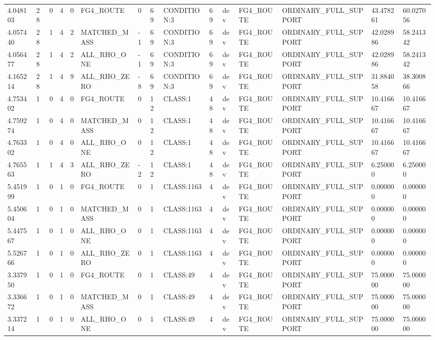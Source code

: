 \begin{tabular}{lllllllllllllll}
4.048103 & 28 & 0 & 4 & 0 & FG4\_ROUTE & 0 & 69 & CONDITION:3 & 69 & dev & FG4\_ROUTE & ORDINARY\_FULL\_SUPPORT & 43.478261 & 60.027056 \\
4.057440 & 28 & 1 & 4 & 2 & MATCHED\_MASS & -1 & 69 & CONDITION:3 & 69 & dev & FG4\_ROUTE & ORDINARY\_FULL\_SUPPORT & 42.028986 & 58.241342 \\
4.056477 & 28 & 1 & 4 & 2 & ALL\_RHO\_ONE & -1 & 69 & CONDITION:3 & 69 & dev & FG4\_ROUTE & ORDINARY\_FULL\_SUPPORT & 42.028986 & 58.241342 \\
4.165214 & 28 & 1 & 4 & 9 & ALL\_RHO\_ZERO & -8 & 69 & CONDITION:3 & 69 & dev & FG4\_ROUTE & ORDINARY\_FULL\_SUPPORT & 31.884058 & 38.300866 \\
4.753402 & 1 & 0 & 4 & 0 & FG4\_ROUTE & 0 & 12 & CLASS:1 & 48 & dev & FG4\_ROUTE & ORDINARY\_FULL\_SUPPORT & 10.416667 & 10.416667 \\
4.759274 & 1 & 0 & 4 & 0 & MATCHED\_MASS & 0 & 12 & CLASS:1 & 48 & dev & FG4\_ROUTE & ORDINARY\_FULL\_SUPPORT & 10.416667 & 10.416667 \\
4.763302 & 1 & 0 & 4 & 0 & ALL\_RHO\_ONE & 0 & 12 & CLASS:1 & 48 & dev & FG4\_ROUTE & ORDINARY\_FULL\_SUPPORT & 10.416667 & 10.416667 \\
4.765563 & 1 & 1 & 4 & 3 & ALL\_RHO\_ZERO & -2 & 12 & CLASS:1 & 48 & dev & FG4\_ROUTE & ORDINARY\_FULL\_SUPPORT & 6.250000 & 6.250000 \\
5.451999 & 1 & 0 & 1 & 0 & FG4\_ROUTE & 0 & 1 & CLASS:1163 & 4 & dev & FG4\_ROUTE & ORDINARY\_FULL\_SUPPORT & 0.000000 & 0.000000 \\
5.450604 & 1 & 0 & 1 & 0 & MATCHED\_MASS & 0 & 1 & CLASS:1163 & 4 & dev & FG4\_ROUTE & ORDINARY\_FULL\_SUPPORT & 0.000000 & 0.000000 \\
5.447567 & 1 & 0 & 1 & 0 & ALL\_RHO\_ONE & 0 & 1 & CLASS:1163 & 4 & dev & FG4\_ROUTE & ORDINARY\_FULL\_SUPPORT & 0.000000 & 0.000000 \\
5.526766 & 1 & 0 & 1 & 0 & ALL\_RHO\_ZERO & 0 & 1 & CLASS:1163 & 4 & dev & FG4\_ROUTE & ORDINARY\_FULL\_SUPPORT & 0.000000 & 0.000000 \\
3.337950 & 1 & 0 & 1 & 0 & FG4\_ROUTE & 0 & 1 & CLASS:49 & 4 & dev & FG4\_ROUTE & ORDINARY\_FULL\_SUPPORT & 75.000000 & 75.000000 \\
3.336672 & 1 & 0 & 1 & 0 & MATCHED\_MASS & 0 & 1 & CLASS:49 & 4 & dev & FG4\_ROUTE & ORDINARY\_FULL\_SUPPORT & 75.000000 & 75.000000 \\
3.337214 & 1 & 0 & 1 & 0 & ALL\_RHO\_ONE & 0 & 1 & CLASS:49 & 4 & dev & FG4\_ROUTE & ORDINARY\_FULL\_SUPPORT & 75.000000 & 75.000000 \\

\end{tabular}
